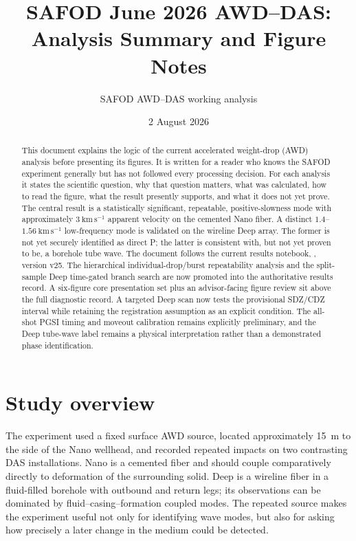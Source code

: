 \documentclass[11pt]{article}
\title{SAFOD June 2026 AWD--DAS: Analysis Summary and Figure Notes}
\author{SAFOD AWD--DAS working analysis}
\date{2 August 2026}
\begin{document}
\maketitle

\begin{abstract}
This document explains the logic of the current accelerated weight-drop (AWD)
analysis before presenting its figures.  It is written for a reader who knows
the SAFOD experiment generally but has not followed every processing decision.
For each analysis it states the scientific question, why that question matters,
what was calculated, how to read the figure, what the result presently supports,
and what it does not yet prove.  The central result is a statistically
significant, repeatable, positive-slowness mode with approximately
$3~\mathrm{km\,s^{-1}}$ apparent velocity on the cemented Nano fiber.  A distinct
$1.4$--$1.56~\mathrm{km\,s^{-1}}$ low-frequency mode is validated on the
wireline Deep array.  The former is not yet securely identified as direct P;
the latter is consistent with, but not yet proven to be, a borehole tube wave.
The document follows the current results notebook,
, version v25.  The hierarchical
individual-drop/burst repeatability analysis and the split-sample Deep
time-gated branch search are now promoted into the authoritative results
record.  A six-figure core presentation set plus an advisor-facing figure
review sit above the full diagnostic record.  A targeted Deep scan now tests
the provisional SDZ/CDZ interval while retaining the registration assumption
as an explicit condition.  The all-shot PGSI timing and moveout calibration
remains explicitly preliminary, and the Deep tube-wave label remains a
physical interpretation rather than a demonstrated phase identification.
\end{abstract}

\tableofcontents
\clearpage

\section{Study overview}

The experiment used a fixed surface AWD source, located approximately 15~m to
the side of the Nano wellhead, and recorded repeated impacts on two contrasting
DAS installations.  Nano is a cemented fiber and should couple comparatively
directly to deformation of the surrounding solid.  Deep is a wireline fiber in
a fluid-filled borehole with outbound and return legs; its observations can be
dominated by fluid--casing--formation coupled modes.  The repeated source makes
the experiment useful not only for identifying wave modes, but also for asking
how precisely a later change in the medium could be detected.
\end{document}
